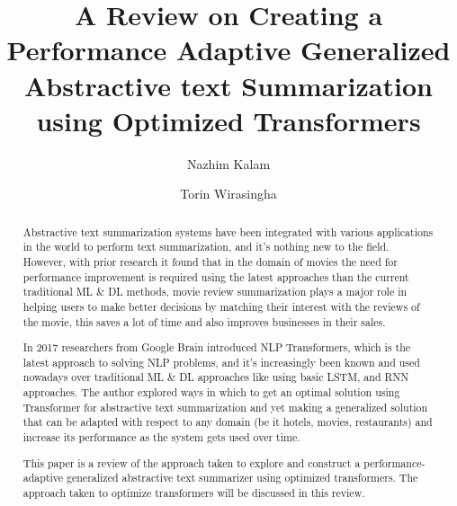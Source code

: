 \documentclass[manuscript,screen,natbib=false]{acmart}
\begin{document}
\title{A Review on Creating a Performance Adaptive Generalized Abstractive text Summarization using Optimized Transformers}

\author{Nazhim Kalam}

\author{Torin Wirasingha}


\begin{abstract}
Abstractive text summarization systems have been integrated with various applications in the world to perform text summarization, and it's nothing new to the field. However, with prior research it found that in the domain of movies the need for performance improvement is required using the latest approaches than the current traditional ML & DL methods, movie review summarization plays a major role in helping users to make better decisions by matching their interest with the reviews of the movie, this saves a lot of time and also improves businesses in their sales.

In 2017 researchers from Google Brain introduced NLP Transformers, which is the latest approach to solving NLP problems, and it's increasingly been known and used nowadays over traditional ML & DL approaches like using basic LSTM, and RNN approaches. The author explored ways in which to get an optimal solution using Transformer for abstractive text summarization and yet making a generalized solution that can be adapted with respect to any domain (be it hotels, movies, restaurants) and increase its performance as the system gets used over time.

This paper is a review of the approach taken to explore and construct a performance-adaptive generalized abstractive text summarizer using optimized transformers. The approach taken to optimize transformers will be discussed in this review.
\end{abstract}
\end{document}
